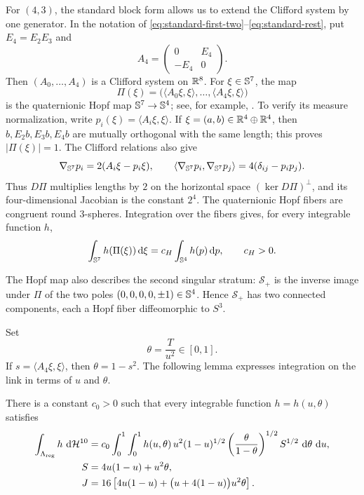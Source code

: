 For $(4,3)$, the standard block form allows us to extend the Clifford
system by one generator.  In the notation of
\eqref{eq:standard-first-two}--\eqref{eq:standard-rest}, put
$E_4=E_2E_3$ and
\[
 A_4=\begin{pmatrix}0&E_4\\-E_4&0\end{pmatrix}.
\]
Then $(A_0,\ldots,A_4)$ is a Clifford system on $\mathbb R^8$.  For
$\xi\in\mathbb S^7$, the map
\begin{equation}\label{eq:hopf-map}
 \Pi(\xi)
 =\bigl(\langle A_0\xi,\xi\rangle,\ldots,
        \langle A_4\xi,\xi\rangle\bigr)
\end{equation}
is the quaternionic Hopf map $\mathbb S^7\to\mathbb S^4$; see, for example,
\cite{FKM81}.  To verify its measure normalization, write
\(p_i(\xi)=\langle A_i\xi,\xi\rangle\).  If
$\xi=(a,b)\in\mathbb R^4\oplus\mathbb R^4$, then
$b,E_2b,E_3b,E_4b$ are mutually orthogonal with the same length;
this proves $|\Pi(\xi)|=1$.  The Clifford relations also give
\begin{equation}\label{eq:hopf-horizontal}
 \nabla_{\mathbb S^7}p_i=2(A_i\xi-p_i\xi),\qquad
 \langle\nabla_{\mathbb S^7}p_i,\nabla_{\mathbb S^7}p_j\rangle
 =4(\delta_{ij}-p_ip_j).
\end{equation}
Thus \(D\Pi\) multiplies lengths by \(2\) on the horizontal space
\((\ker D\Pi)^\perp\), and its four-dimensional Jacobian is the
constant \(2^4\).
The quaternionic Hopf fibers are congruent round \(3\)-spheres.
Integration over the fibers gives, for every integrable function \(h\),
\[
 \int_{\mathbb S^7}h(\Pi(\xi))\,\mathrm d\xi
 =c_H\int_{\mathbb S^4}h(p)\,\mathrm d p,
 \qquad c_H>0.
\]

The Hopf map also describes the second singular stratum: $\mathscr S_+$ is the inverse image under $\Pi$ of the two poles
$(0,0,0,0,\pm1)\in\mathbb S^4$.  Hence $\mathscr S_+$ has two connected
components, each a Hopf fiber diffeomorphic to $S^3$.

Set
\[
 \theta=\frac{T}{u^2}\in[0,1].
\]
If $s=\langle A_4\xi,\xi\rangle$, then $\theta=1-s^2$.
The following lemma expresses integration on the link in terms of
$u$ and $\theta$.

\begin{lemma}
\label{lem:hopf-coarea}
There is a constant $c_0>0$ such that every integrable function
$h=h(u,\theta)$ satisfies
\begin{align}
 \int_{\Lambda_{\mathrm{reg}}}h\,\,\mathrm d\mathcal H^{10}
 &=c_0\int_0^1\int_0^1
     h(u,\theta)\,
     u^2(1-u)^{1/2}
     \left(\frac{\theta}{1-\theta}\right)^{1/2}
     S^{1/2}\,\,\mathrm d\theta\,\,\mathrm d u,
 \label{eq:hopf-coarea}\\
 S&=4u(1-u)+u^2\theta,                                  \notag\\
 J&=16\left[
       4u(1-u)+\bigl(u+4(1-u)\bigr)u^2\theta
     \right].
 \label{eq:Clifford-link-SJ}
\end{align}
\end{lemma}

